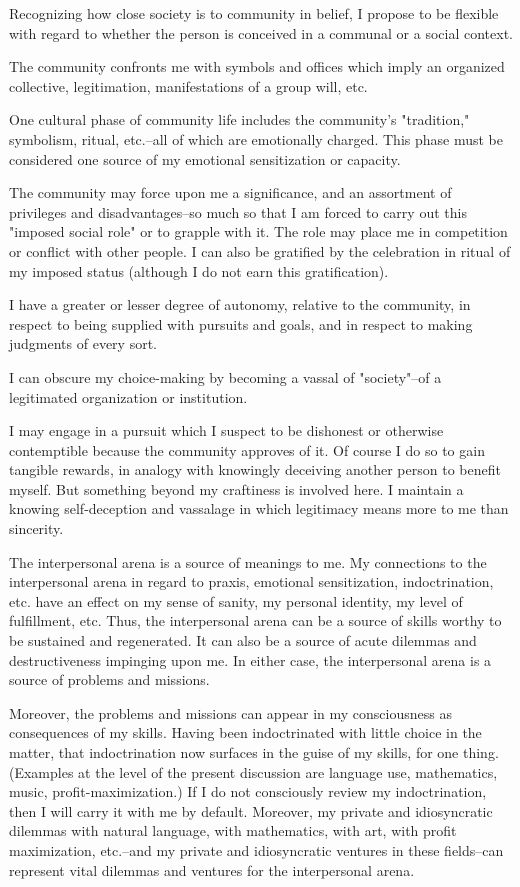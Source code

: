 \begin{enumerate}[label=\alph*.]
Recognizing how close society is to community in belief, I propose to be flexible with regard to whether the person is conceived in a communal or a social context.

The community confronts me with symbols and offices which imply an organized collective, legitimation, manifestations of a group will, etc.

One cultural phase of community life includes the community's "tradition," symbolism, ritual, etc.–all of which are emotionally charged. This phase must be considered one source of my emotional sensitization or capacity.

The community may force upon me a significance, and an assortment of privileges and disadvantages–so much so that I am forced to carry out this "imposed social role" or to grapple with it. The role may place me in competition or conflict with other people. I can also be gratified by the celebration in ritual of my imposed status (although I do not earn this gratification).

I have a greater or lesser degree of autonomy, relative to the community, in respect to being supplied with pursuits and goals, and in respect to making judgments of every sort.

I can obscure my choice-making by becoming a vassal of "society"–of a legitimated organization or institution.

I may engage in a pursuit which I suspect to be dishonest or otherwise contemptible because the community approves of it. Of course I do so to gain tangible rewards, in analogy with knowingly deceiving another person to benefit myself. But something beyond my craftiness is involved here. I maintain a knowing self-deception and vassalage in which legitimacy means more to me than sincerity.

The interpersonal arena is a source of meanings to me. My connections to the interpersonal arena in regard to praxis, emotional sensitization, indoctrination, etc. have an effect on my sense of sanity, my personal identity, my level of fulfillment, etc. Thus, the interpersonal arena can be a source of skills worthy to be sustained and regenerated. It can also be a source of acute dilemmas and destructiveness impinging upon me. In either case, the interpersonal arena is a source of problems and missions.

Moreover, the problems and missions can appear in my consciousness as consequences of my skills. Having been indoctrinated with little choice in the matter, that indoctrination now surfaces in the guise of my skills, for one thing. (Examples at the level of the present discussion are language use, mathematics, music, profit-maximization.) If I do not consciously review my indoctrination, then I will carry it with me by default. Moreover, my private and idiosyncratic dilemmas with natural language, with mathematics, with art, with profit maximization, etc.–and my private and idiosyncratic ventures in these fields–can represent vital dilemmas and ventures for the interpersonal arena.


\end{enumerate}
